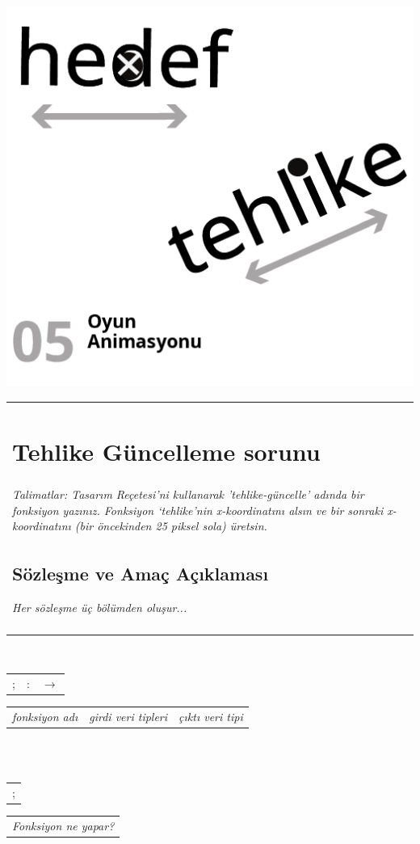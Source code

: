 \documentclass[12pt, a4paper]{article}
\begin{document}
\newpage
\includegraphics[width=1\linewidth]{cebir-bolum-05-000.png}
\newpage
\noindent \begin{tabular}{p{16cm}}
\section*{Tehlike Güncelleme sorunu}
\\
\textit{Talimatlar: Tasarım Reçetesi’ni kullanarak ’tehlike-güncelle’ adında bir fonksiyon yazınız. Fonksiyon ‘tehlike’nin x-koordinatını alsın ve bir sonraki x-koordinatını (bir öncekinden 25 piksel sola) üretsin.}\\
\subsection*{Sözleşme ve Amaç Açıklaması}
\textit{Her sözleşme üç bölümden oluşur...}\\[10ex]
\\
\end{tabular}\\
\noindent \begin{tabular}{L{4cm} L{6cm} L{6cm}}
;\dotfill &:\dotfill &$\rightarrow$\dotfill \\
\end{tabular}
\noindent \begin{tabular}{C{4cm} C{6cm} C{6cm}}
\textit{fonksiyon adı} & \textit{girdi veri tipleri} & \textit{çıktı veri tipi} \\
\end{tabular}\\
\\
\noindent \begin{tabular}{L{17cm}}
{;\dotfill}\\
\end{tabular}
\noindent \begin{tabular}{C{17cm}}
{\textit{Fonksiyon ne yapar?}}\\
\end{tabular}
\end{document}
